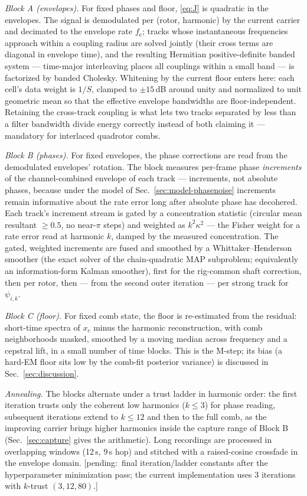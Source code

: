 \documentclass[journal]{IEEEtran}
\newcommand{\fsenv}{\ensuremath{f_{\mathrm{e}}}}
\newcommand{\pending}[1]{{\color{gray}\textsf{[pending:~#1]}}}
\begin{document}
\emph{Block A (envelopes).} For fixed phases and floor, \eqref{eq:J} is
quadratic in the envelopes. The signal is demodulated per (rotor,
harmonic) by the current carrier and decimated to the envelope rate
$\fsenv$; tracks whose instantaneous frequencies approach within a
coupling radius are solved jointly (their cross terms are diagonal in
envelope time), and the resulting Hermitian positive-definite banded
system --- time-major interleaving places all couplings within a small
band --- is factorized by banded Cholesky. Whitening by the current
floor enters here: each cell's data weight is $1/S$, clamped to
$\pm15$\,dB around unity and normalized to unit geometric mean so that
the effective envelope bandwidths are floor-independent. Retaining the
cross-track coupling is what lets two tracks separated by less than a
filter bandwidth divide energy correctly instead of both claiming it ---
mandatory for interlaced quadrotor combs.

\emph{Block B (phases).} For fixed envelopes, the phase corrections are
read from the demodulated envelopes' rotation. The block measures
per-frame phase \emph{increments} of the channel-combined envelope of
each track --- increments, not absolute phases, because under the model
of Sec.~\ref{sec:model-phasenoise} increments remain informative about
the rate error long after absolute phase has decohered. Each track's
increment stream is gated by a concentration statistic (circular mean
resultant $\ge 0.5$, no near-$\pi$ steps) and weighted as $k^2 \kappa^2$
--- the Fisher weight for a rate error read at harmonic $k$, damped by
the measured concentration. The gated, weighted increments are fused and
smoothed by a Whittaker--Henderson smoother (the exact solver of the
chain-quadratic MAP subproblem; equivalently an information-form Kalman
smoother), first for the rig-common shaft correction, then per rotor,
then --- from the second outer iteration --- per strong track for
$\psi_{i,k}$.

\emph{Block C (floor).} For fixed comb state, the floor is re-estimated
from the residual: short-time spectra of $x_c$ minus the harmonic
reconstruction, with comb neighborhoods masked, smoothed by a moving
median across frequency and a cepstral lift, in a small number of time
blocks. This is the M-step; its bias (a hard-EM floor sits low by the
comb-fit posterior variance) is discussed in
Sec.~\ref{sec:discussion}.

\emph{Annealing.} The blocks alternate under a trust ladder in harmonic
order: the first iteration trusts only the coherent low harmonics
($k \le 3$) for phase reading, subsequent iterations extend to
$k \le 12$ and then to the full comb, as the improving carrier brings
higher harmonics inside the capture range of Block B
(Sec.~\ref{sec:capture} gives the arithmetic). Long recordings are
processed in overlapping windows (12\,s, 9\,s hop) and stitched with a
raised-cosine crossfade in the envelope domain.
\pending{final iteration/ladder constants after the hyperparameter
minimization pass; the current implementation uses 3 iterations with
$k$-trust $(3, 12, 80)$.}
\end{document}
